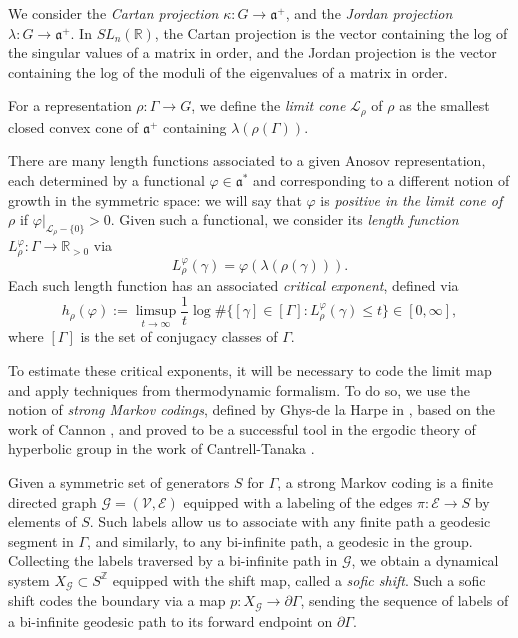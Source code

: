 \documentclass{amsart}
\newcommand{\RR}{\mathbb{R}}
\theoremstyle{remark}
\theoremstyle{definition}
\begin{document}
We consider the \emph{Cartan projection} $\kappa: G \to \mathfrak{a}^+$, and the \emph{Jordan projection} $\lambda: G \rightarrow \mathfrak{a}^+$. In $SL_n(\RR)$, the Cartan projection is the vector containing the log of the singular values of a matrix in order, and the Jordan projection is the vector containing the log of the moduli of the eigenvalues of a matrix in order.

For a representation $\rho: \Gamma \to G$, we define the \emph{limit cone} $\mathcal{L}_\rho$ of $\rho$ as the smallest closed convex cone of $\mathfrak{a}^+$ containing $\lambda (\rho(\Gamma))$. 

There are many length functions associated to a given Anosov representation, each determined by a functional $\varphi \in \mathfrak{a}^*$ and corresponding to a different notion of growth in the symmetric space: we will say that $\varphi$ is \emph{positive in the limit cone of $\rho$} if $\varphi|_{\mathcal{L}_\rho - \{0\}} > 0$. 
Given such a functional, we consider its \emph{length function} $L^\varphi_\rho : \Gamma \rightarrow \mathbb{R}_{>0}$ via
$$L^\varphi_\rho (\gamma) = \varphi (\lambda (\rho (\gamma))).$$
Each such length function has an associated \emph{critical exponent}, defined via
$$h_\rho(\varphi) := \limsup_{t\to \infty} \frac{1}{t} \log \# \{ [\gamma] \in [\Gamma] : L^\varphi_\rho (\gamma) \leq t\} \in [0,\infty],$$
where $[\Gamma]$ is the set of conjugacy classes of $\Gamma$.

To estimate these critical exponents, it will be necessary to code the limit map and apply techniques from thermodynamic formalism. To do so, we use the notion of \emph{strong Markov codings}, defined by Ghys-de la Harpe in \cite{ghys1990sur}, based on the work of Cannon \cite{cannon1984combinatorial}, and proved to be a successful tool in the ergodic theory of hyperbolic group in the work of Cantrell-Tanaka \cite{cantrell2025manhattan}.

Given a symmetric set of generators $S$ for $\Gamma$, a strong Markov coding is a finite directed graph $\mathcal{G} = (\mathcal{V},\mathcal{E})$ equipped with a labeling of the edges $\pi: \mathcal{E} \to S$ by elements of $S$. Such labels allow us to associate with any finite path a geodesic segment in $\Gamma$, and similarly, to any bi-infinite path, a geodesic in the group.
Collecting the labels traversed by a bi-infinite path in $\mathcal{G}$, we obtain a dynamical system $X_\mathcal{G} \subset S^\mathbb{Z}$ equipped with the shift map, called a \emph{sofic shift}.
Such a sofic shift codes the boundary via a map $p: X_\mathcal{G} \rightarrow \partial \Gamma$, sending the sequence of labels of a bi-infinite geodesic path to its forward endpoint on $\partial\Gamma$.
\end{document}
